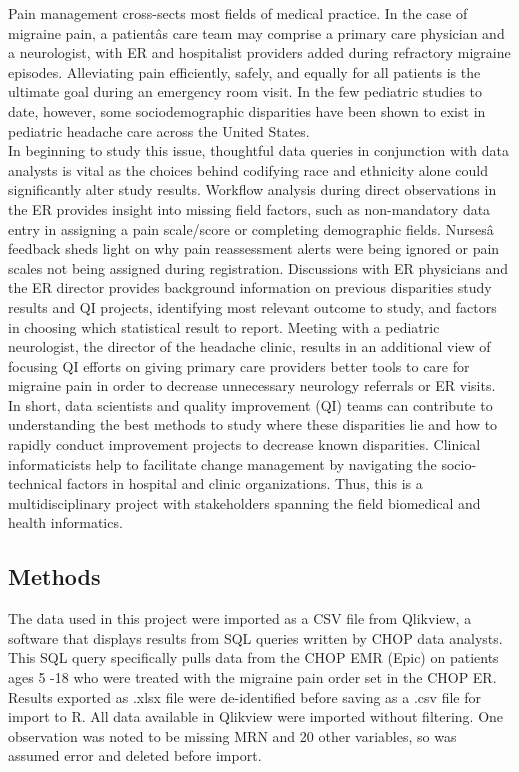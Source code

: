 \documentclass[]{article}
\begin{document}
Pain management cross-sects most fields of medical practice. In the case
of migraine pain, a patientâs care team may comprise a primary care
physician and a neurologist, with ER and hospitalist providers added
during refractory migraine episodes. Alleviating pain efficiently,
safely, and equally for all patients is the ultimate goal during an
emergency room visit. In the few pediatric studies to date, however,
some sociodemographic disparities have been shown to exist in pediatric
headache care across the United States.\\
In beginning to study this issue, thoughtful data queries in conjunction
with data analysts is vital as the choices behind codifying race and
ethnicity alone could significantly alter study results. Workflow
analysis during direct observations in the ER provides insight into
missing field factors, such as non-mandatory data entry in assigning a
pain scale/score or completing demographic fields. Nursesâ feedback
sheds light on why pain reassessment alerts were being ignored or pain
scales not being assigned during registration. Discussions with ER
physicians and the ER director provides background information on
previous disparities study results and QI projects, identifying most
relevant outcome to study, and factors in choosing which statistical
result to report. Meeting with a pediatric neurologist, the director of
the headache clinic, results in an additional view of focusing QI
efforts on giving primary care providers better tools to care for
migraine pain in order to decrease unnecessary neurology referrals or ER
visits. In short, data scientists and quality improvement (QI) teams can
contribute to understanding the best methods to study where these
disparities lie and how to rapidly conduct improvement projects to
decrease known disparities. Clinical informaticists help to facilitate
change management by navigating the socio-technical factors in hospital
and clinic organizations. Thus, this is a multidisciplinary project with
stakeholders spanning the field biomedical and health informatics.

\subsection{Methods}\label{methods}

The data used in this project were imported as a CSV file from Qlikview,
a software that displays results from SQL queries written by CHOP data
analysts. This SQL query specifically pulls data from the CHOP EMR
(Epic) on patients ages 5 -18 who were treated with the migraine pain
order set in the CHOP ER. Results exported as .xlsx file were
de-identified before saving as a .csv file for import to R. All data
available in Qlikview were imported without filtering. One observation
was noted to be missing MRN and 20 other variables, so was assumed error
and deleted before import.
\end{document}
